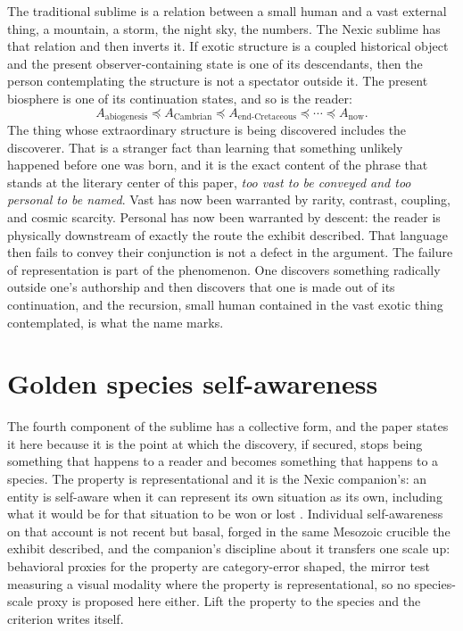 The traditional sublime is a relation between a small human and a vast
external thing, a mountain, a storm, the night sky, the numbers. The
Nexic sublime has that relation and then inverts it. If exotic structure
is a coupled historical object and the present observer-containing
state is one of its descendants, then the person contemplating the
structure is not a spectator outside it. The present biosphere is one
of its continuation states, and so is the reader:
\[
A_{\mathrm{abiogenesis}}\preceq A_{\mathrm{Cambrian}}\preceq
A_{\mathrm{end\text{-}Cretaceous}}\preceq\cdots\preceq A_{\mathrm{now}}.
\]
The thing whose extraordinary structure is being discovered includes
the discoverer. That is a stranger fact than learning that something
unlikely happened before one was born, and it is the exact content of
the phrase that stands at the literary center of this paper, \emph{too
vast to be conveyed and too personal to be named}. Vast has now been
warranted by rarity, contrast, coupling, and cosmic scarcity. Personal
has now been warranted by descent: the reader is physically downstream of
exactly the route the exhibit described. That language then fails to
convey their conjunction is not a defect in the argument. The failure of
representation is part of the phenomenon. One discovers something
radically outside one's authorship and then discovers that one is made
out of its continuation, and the recursion, small human contained in
the vast exotic thing contemplated, is what the name marks.

\section{Golden species self-awareness}\label{sec:selfaware}

The fourth component of the sublime has a collective form, and the
paper states it here because it is the point at which the discovery, if secured, stops being something that happens to a reader and becomes something
that happens to a species. The property is representational and it is
the Nexic companion's: an entity is self-aware when it can represent its
own situation as its own, including what it would be for that situation
to be won or lost \cite{Nexus}. Individual self-awareness on that account
is not recent but basal, forged in the same Mesozoic crucible the
exhibit described, and the companion's discipline about it transfers
one scale up: behavioral proxies for the property are category-error
shaped, the mirror test measuring a visual modality where the property
is representational, so no species-scale proxy is proposed here either.
Lift the property to the species and the criterion writes itself.

